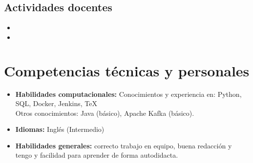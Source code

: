 \documentclass[11pt,a4paper,sans]{moderncv}        %
\begin{document}
\subsection{Actividades docentes}

\vspace{5pt}

\begin{itemize}

\item{}

\item{}

\end{itemize}

\section{Competencias técnicas y personales}

\vspace{6pt}

\begin{itemize}

\item \textbf{Habilidades computacionales:} Conocimientos y experiencia en: Python, SQL, Docker, Jenkins, TeX \\ Otros conocimientos: Java (básico), Apache Kafka (básico).

\vspace{6pt}

\item \textbf{Idiomas:} Inglés (Intermedio)

\vspace{6pt}

\item \textbf{Habilidades generales:} correcto trabajo en equipo, buena redacción y tengo y facilidad para aprender de forma autodidacta.



\end{itemize}
\end{document}
